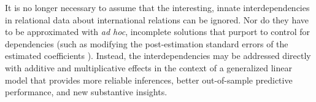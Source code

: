 It is no longer necessary to assume that the interesting, innate interdependencies in relational data about international relations can be ignored. Nor do they have to be approximated with \textit{ad hoc}, incomplete solutions that purport to control for dependencies (such as modifying the post-estimation standard errors of the estimated coefficients \citealp{king:roberts:2014}). Instead, the interdependencies may be addressed directly with additive and multiplicative effects in the context of a generalized linear model that provides more reliable inferences, better out-of-sample predictive performance, and new substantive insights. 